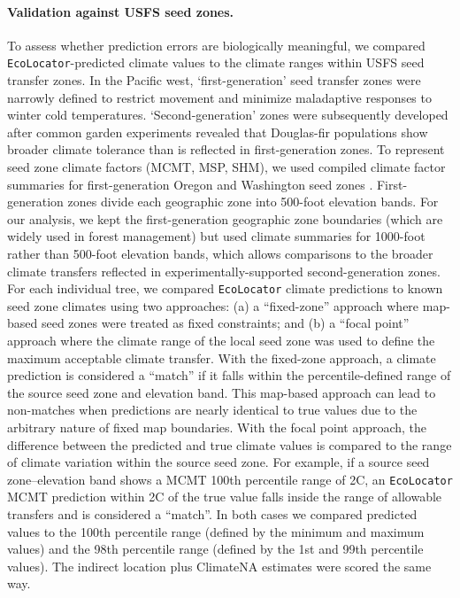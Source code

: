 \documentclass[]{article}
\newcommand{\dfir}{Douglas-fir\xspace}
\newcommand{\ecolocator}{\texttt{EcoLocator}\xspace}
\providecommand{\revpoint}[2]{}%
\begin{document}

\paragraph{Validation against USFS seed zones.}
To assess whether prediction errors are biologically meaningful,
we compared \ecolocator-predicted climate values to the climate ranges
within USFS seed transfer zones. In the Pacific west, `first-generation'
seed transfer zones \citep{usdaforestservice_tree_1973} were narrowly
defined to restrict movement and minimize maladaptive responses to winter
cold temperatures. `Second-generation' zones \citep{randall_forest_1996, randall_washington_2002}
were subsequently developed after common garden experiments revealed that
\dfir populations show broader climate tolerance than is reflected in first-generation zones.
To represent seed zone climate factors (MCMT, MSP, SHM), we used compiled climate factor summaries for 
first-generation Oregon and Washington seed zones \citep{shalev_zone_2026}.
First-generation zones divide each geographic zone into 500-foot elevation bands.
For our analysis, we kept the first-generation geographic zone boundaries
(which are widely used in forest management)
but used climate summaries for 1000-foot rather than 500-foot elevation bands\revpoint{2}{13},
which allows comparisons to the broader climate
transfers reflected in experimentally-supported second-generation zones.
For each individual tree, we compared \ecolocator climate predictions to known seed zone climates
using two approaches:
(a) a ``fixed-zone'' approach where map-based seed zones were treated as fixed constraints; and
(b) a ``focal point'' approach where the climate range of the local seed zone was used
to define the maximum acceptable climate transfer.
With the fixed-zone approach, a climate prediction is considered a ``match'' if it falls within
the percentile-defined range of the source seed zone and elevation band. This map-based
approach can lead to non-matches when predictions are nearly identical to true values
due to the arbitrary nature of fixed map boundaries.
With the focal point approach, the difference between the predicted
and true climate values is compared to the range of climate variation within the source seed
zone. For example, if a source seed zone--elevation band shows a
MCMT 100th percentile range of 2\textdegree{}C, an \ecolocator MCMT prediction
within 2\textdegree{}C of the true value falls inside the range of allowable transfers
and is considered a ``match''.
In both cases we compared predicted values to the 100th percentile range
(defined by the minimum and maximum values)
and the 98th percentile range (defined by the 1st and 99th percentile values).
The indirect location plus ClimateNA estimates were scored the same way.
\end{document}
